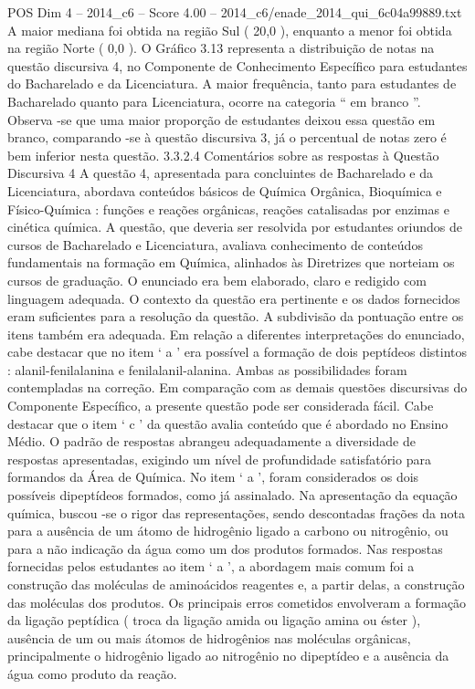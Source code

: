 \begin{textsample}{POS Dim 4 – 2014\_c6 – Score 4.00 – 2014\_c6/enade\_2014\_qui\_6c04a99889.txt}
A maior mediana foi obtida na região Sul ( 20,0 ), enquanto a menor foi obtida na região Norte ( 0,0 ).
O Gráfico 3.13 representa a distribuição de notas na questão discursiva 4, no Componente de Conhecimento Específico para estudantes do Bacharelado e da Licenciatura.
A maior frequência, tanto para estudantes de Bacharelado quanto para Licenciatura, ocorre na categoria “ em branco ”.
Observa -se que uma maior proporção de estudantes deixou essa questão em branco, comparando -se à questão discursiva 3, já o percentual de notas zero é bem inferior nesta questão. 3.3.2.4 Comentários sobre as respostas à Questão Discursiva 4 A questão 4, apresentada para concluintes de Bacharelado e da Licenciatura, abordava conteúdos básicos de Química Orgânica, Bioquímica e Físico-Química : funções e reações orgânicas, reações catalisadas por enzimas e cinética química.
A questão, que deveria ser resolvida por estudantes oriundos de cursos de Bacharelado e Licenciatura, avaliava conhecimento de conteúdos fundamentais na formação em Química, alinhados às Diretrizes que norteiam os cursos de graduação.
O enunciado era bem elaborado, claro e redigido com linguagem adequada.
O contexto da questão era pertinente e os dados fornecidos eram suficientes para a resolução da questão.
A subdivisão da pontuação entre os itens também era adequada.
Em relação a diferentes interpretações do enunciado, cabe destacar que no item ‘ a ’ era possível a formação de dois peptídeos distintos : alanil-fenilalanina e fenilalanil-alanina.
Ambas as possibilidades foram contempladas na correção.
Em comparação com as demais questões discursivas do Componente Específico, a presente questão pode ser considerada fácil.
Cabe destacar que o item ‘ c ’ da questão avalia conteúdo que é abordado no Ensino Médio.
O padrão de respostas abrangeu adequadamente a diversidade de respostas apresentadas, exigindo um nível de profundidade satisfatório para formandos da Área de Química.
No item ‘ a ’, foram considerados os dois possíveis dipeptídeos formados, como já assinalado.
Na apresentação da equação química, buscou -se o rigor das representações, sendo descontadas frações da nota para a ausência de um átomo de hidrogênio ligado a carbono ou nitrogênio, ou para a não indicação da água como um dos produtos formados.
Nas respostas fornecidas pelos estudantes ao item ‘ a ’, a abordagem mais comum foi a construção das moléculas de aminoácidos reagentes e, a partir delas, a construção das moléculas dos produtos.
Os principais erros cometidos envolveram a formação da ligação peptídica ( troca da ligação amida ou ligação amina ou éster ), ausência de um ou mais átomos de hidrogênios nas moléculas orgânicas, principalmente o hidrogênio ligado ao nitrogênio no dipeptídeo e a ausência da água como produto da reação.

\end{textsample}
